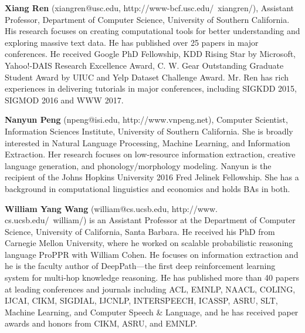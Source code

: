   {\bfseries Xiang Ren} (xiangren@usc.edu, http://www-bcf.usc.edu/~xiangren/), Assistant Professor, Department of Computer Science, University of Southern California. His research focuses on creating computational tools for better understanding and exploring massive text data. He has published over 25 papers in major conferences. He received Google PhD Fellowship, KDD Rising Star by Microsoft, Yahoo!-DAIS Research Excellence Award, C. W. Gear Outstanding Graduate Student Award by UIUC and Yelp Dataset Challenge Award. Mr. Ren has rich experiences in delivering tutorials in major conferences, including SIGKDD 2015, SIGMOD 2016 and WWW 2017. 

  {\bfseries Nanyun Peng} (npeng@isi.edu, http://www.vnpeng.net), Computer Scientist, Information Sciences Institute, University of Southern California. She is broadly interested in Natural Language Processing, Machine Learning, and Information Extraction. Her research focuses on low-resource information extraction, creative language generation, and phonology/morphology modeling. Nanyun is the recipient of the Johns Hopkins University 2016 Fred Jelinek Fellowship. She has a background in computational linguistics and economics and holds BAs in both.

  {\bfseries William Yang Wang} (william@cs.ucsb.edu, http://www. cs.ucsb.edu/~william/) is an Assistant Professor at the Department of Computer Science, University of California, Santa Barbara. He received his PhD from Carnegie Mellon University, where he worked on scalable probabilistic reasoning language ProPPR with William Cohen. He focuses on information extraction and he is the faculty author of DeepPath—the first deep reinforcement learning system for multi-hop knowledge reasoning. He has published more than 40 papers at leading conferences and journals including ACL, EMNLP, NAACL, COLING, IJCAI, CIKM, SIGDIAL, IJCNLP, INTERSPEECH, ICASSP, ASRU, SLT, Machine Learning, and Computer Speech & Language, and he has received paper awards and honors from CIKM, ASRU, and EMNLP.
  